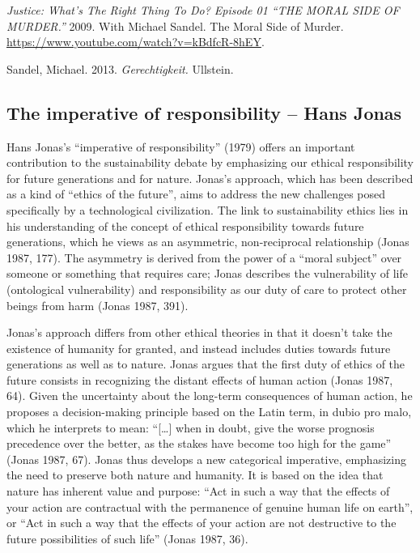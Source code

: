 \documentclass[
  a4paper,
  openany]{book}
\begin{document}
\begin{tcolorbox}[enhanced jigsaw, coltitle=black, bottomtitle=1mm, opacitybacktitle=0.6, titlerule=0mm, opacityback=0, leftrule=.75mm, colbacktitle=quarto-callout-note-color!10!white, bottomrule=.15mm, toptitle=1mm, breakable, title={Further reading}, arc=.35mm, rightrule=.15mm, toprule=.15mm, left=2mm, colback=white, colframe=quarto-callout-note-color-frame]

\emph{Justice: What's The Right Thing To Do? Episode 01 ``THE MORAL SIDE
OF MURDER.''} 2009. With Michael Sandel. The Moral Side of Murder.
\url{https://www.youtube.com/watch?v=kBdfcR-8hEY}.

Sandel, Michael. 2013. \emph{Gerechtigkeit.} Ullstein.

\end{tcolorbox}

\subsection{The imperative of responsibility -- Hans
Jonas}\label{the-imperative-of-responsibility-hans-jonas}

Hans Jonas's ``imperative of responsibility'' (1979) offers an important
contribution to the sustainability debate by emphasizing our ethical
responsibility for future generations and for nature. Jonas's approach,
which has been described as a kind of ``ethics of the future'', aims to
address the new challenges posed specifically by a technological
civilization. The link to sustainability ethics lies in his
understanding of the concept of ethical responsibility towards future
generations, which he views as an asymmetric, non-reciprocal
relationship (Jonas 1987, 177). The asymmetry is derived from the power
of a ``moral subject'' over someone or something that requires care;
Jonas describes the vulnerability of life (ontological vulnerability)
and responsibility as our duty of care to protect other beings from harm
(Jonas 1987, 391).

Jonas's approach differs from other ethical theories in that it doesn't
take the existence of humanity for granted, and instead includes duties
towards future generations as well as to nature. Jonas argues that the
first duty of ethics of the future consists in recognizing the distant
effects of human action (Jonas 1987, 64). Given the uncertainty about
the long-term consequences of human action, he proposes a
decision-making principle based on the Latin term, in dubio pro malo,
which he interprets to mean: ``{[}\ldots{]} when in doubt, give the
worse prognosis precedence over the better, as the stakes have become
too high for the game'' (Jonas 1987, 67). Jonas thus develops a new
categorical imperative, emphasizing the need to preserve both nature and
humanity. It is based on the idea that nature has inherent value and
purpose: ``Act in such a way that the effects of your action are
contractual with the permanence of genuine human life on earth'', or
``Act in such a way that the effects of your action are not destructive
to the future possibilities of such life'' (Jonas 1987, 36).
\end{document}
